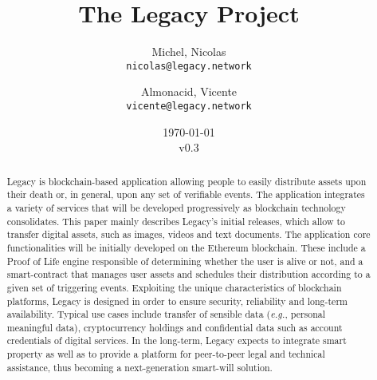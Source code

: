 \documentclass[12pt,french,english,notitlepage]{report} %
\title{The Legacy Project}
\author{
  Michel, Nicolas\\
  \texttt{nicolas@legacy.network}
  \and
  Almonacid, Vicente\\
  \texttt{vicente@legacy.network}
}
\date{\today\\v0.3}
\newcommand{\bibpath}{.}
\begin{document}

\maketitle
\begin{abstract}
    Legacy is blockchain-based application allowing people to easily distribute assets upon their death or, in general, upon any set of verifiable events.
    The application integrates a variety of services that will be developed progressively as blockchain technology consolidates. 
    This paper mainly describes Legacy's initial releases, which allow to transfer digital assets, such as images, videos and text documents. 
    The application core functionalities will be initially developed on the Ethereum blockchain. These include a Proof of Life engine responsible of determining whether the user is alive or not, and a smart-contract that manages user assets and schedules their distribution according to a given set of triggering events.
    Exploiting the unique characteristics of blockchain platforms, Legacy is designed in order to ensure security, reliability and long-term availability. 
    Typical use cases include transfer of sensible data (\textit{e.g.}, personal meaningful data), cryptocurrency holdings and confidential data such as account credentials of digital services. 
    In the long-term, Legacy expects to integrate smart property as well as to provide a platform for peer-to-peer legal and technical assistance, thus becoming a next-generation smart-will solution.

\end{abstract}



\tableofcontents




%



%

%
%



%
%
%
%
\printbibliography
\end{document}
